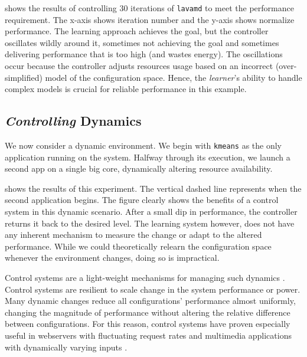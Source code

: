  shows the results of controlling 30
iterations of \texttt{lavamd} to meet the performance requirement.
The x-axis shows iteration number and the y-axis shows normalize
performance.  The learning approach achieves the goal, but the
controller oscillates wildly around it, sometimes not achieving the
goal and sometimes delivering performance that is too high (and wastes
energy). The oscillations occur because the controller adjusts
resources usage based on an incorrect (over-simplified) model of
the configuration space. Hence, the \emph{learner}'s ability to handle
complex models is crucial for reliable performance in this example.


\subsection{\emph{Controlling} Dynamics}
We now consider a dynamic environment.  We begin with \texttt{kmeans}
as the only application running on the system.  Halfway through its
execution, we launch a second app on a single big core,
dynamically altering resource availability.  

 shows the results of this experiment.
The vertical dashed line represents when the second application
begins.  The figure clearly shows the benefits of a control system in
this dynamic scenario.  After a small dip in performance, the
controller returns it back to the desired level.  The learning system
however, does not have any inherent mechanism to measure the change or
adapt to the altered performance.  While we could theoretically
relearn the configuration space whenever the environment changes,
doing so is impractical.

Control systems are a light-weight mechanisms for managing such
dynamics \cite{Hellerstein2004a}. Control systems are resilient to
scale change in the system performance or power.  Many dynamic changes
reduce all configurations' performance almost uniformly, changing the
magnitude of performance without altering the relative difference
between configurations.  For this reason, control systems have proven
especially useful in webservers with fluctuating request rates
\cite{Horvarth,LuEtAl-2006a,SunDaiPan-2008a} and multimedia
applications with dynamically varying inputs
\cite{TCST,Agilos,grace2}.

